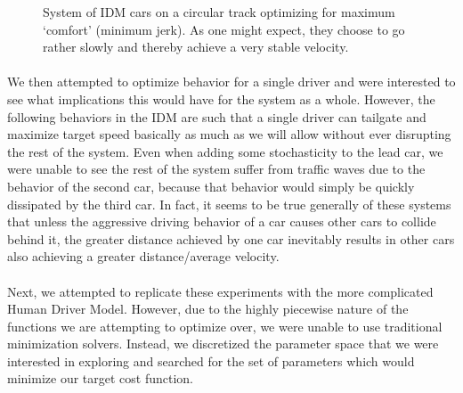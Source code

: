 \documentclass[12pt]{article}
\begin{document}
\begin{figure}[H]
  \centering
  \caption{System of IDM cars on a circular track optimizing for maximum `comfort' (minimum jerk). As one might expect, they choose to go rather slowly and thereby achieve a very stable velocity.}
\end{figure}


\paragraph{}We then attempted to optimize behavior for a single driver and were interested to see what implications this would have for the system as a whole. However, the following behaviors in the IDM are such that a single driver can tailgate and maximize target speed basically as much as we will allow without ever disrupting the rest of the system. Even when adding some stochasticity to the lead car, we were unable to see the rest of the system suffer from traffic waves due to the behavior of the second car, because that behavior would simply be quickly dissipated by the third car. In fact, it seems to be true generally of these systems that unless the aggressive driving behavior of a car causes other cars to collide behind it, the greater distance achieved by one car inevitably results in other cars also achieving a greater distance/average velocity.


\paragraph{}Next, we attempted to replicate these experiments with the more complicated Human Driver Model. However, due to the highly piecewise nature of the functions we are attempting to optimize over, we were unable to use traditional minimization solvers. Instead, we discretized the parameter space that we were interested in exploring and searched for the set of parameters which would minimize our target cost function.
\end{document}
